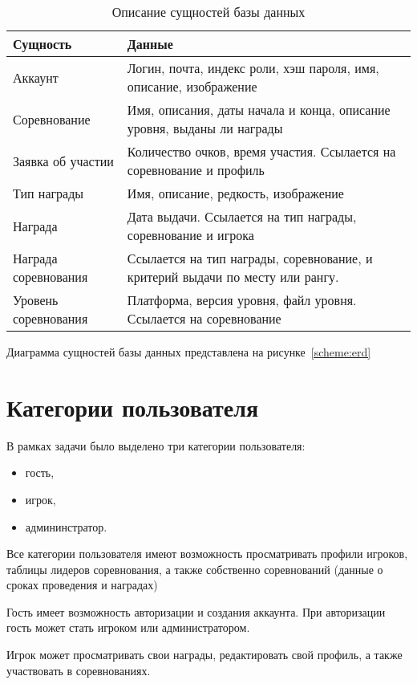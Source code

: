 \begin{table}[h!]
	\caption{\label{tbl:dataop}Описание сущностей базы данных}
	\begin{tabular}{|l|p{8cm}|}
		\hline
		Сущность & Данные \\\hline
		Аккаунт & Логин, почта, индекс роли, хэш пароля, имя, описание, изображение \\\hline
		Соревнование & Имя, описания, даты начала и конца, описание уровня, выданы ли награды \\\hline
		Заявка об участии & Количество очков, время участия. Ссылается на соревнование и профиль \\\hline
		Тип награды & Имя, описание, редкость, изображение\\\hline
		Награда & Дата выдачи. Ссылается на тип награды, соревнование и игрока \\\hline
		Награда соревнования & Ссылается на тип награды, соревнование, и критерий выдачи по месту или рангу.\\\hline
		Уровень соревнования & Платформа, версия уровня, файл уровня. Ссылается на соревнование\\\hline
	\end{tabular}
\end{table}
\FloatBarrier
Диаграмма сущностей базы данных представлена на рисунке~\ref{scheme:erd}

\FloatBarrier
\section{Категории пользователя}

В рамках задачи было выделено три категории пользователя:
\begin{itemize}
	\item гость,
	\item игрок,
	\item админинстратор.
\end{itemize}

Все категории пользователя имеют возможность просматривать профили игроков, таблицы лидеров соревнования, а также собственно соревнований (данные о сроках проведения и наградах)

Гость имеет возможность авторизации и создания аккаунта. При авторизации гость может стать игроком или администратором.

Игрок может просматривать свои награды, редактировать свой профиль, а также участвовать в соревнованиях.

